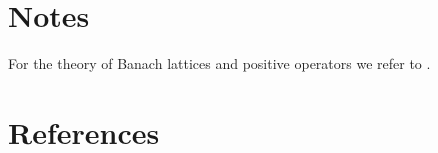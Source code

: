 \section*{Notes}

For the theory of Banach lattices and positive operators we refer to \citet{schaefer:1974}.

\section*{References}
{\RaggedRight
\renewcommand{\bibsection}{}

}
